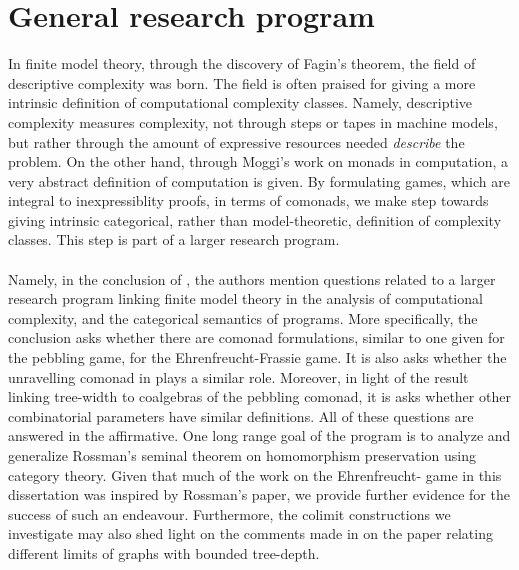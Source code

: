 \section{General research program}
In finite model theory, through the discovery of Fagin's theorem, the field of descriptive complexity was born. The field is often praised for giving a more intrinsic definition of computational complexity classes. Namely, descriptive complexity measures complexity, not through steps or tapes in machine models, but rather through the amount of expressive resources needed \textit{describe} the problem. On the other hand, through Moggi's work on monads in computation, a very abstract definition of computation is given. By formulating games, which are integral to inexpressiblity proofs, in terms of comonads, we make step towards giving intrinsic categorical, rather than model-theoretic, definition of complexity classes. This step is part of a larger research program. \\~\\
Namely, in the conclusion of \cite{Abramsky2017}, the authors mention questions related to a larger research program linking finite model theory in the analysis of computational complexity, and the categorical semantics of programs. More specifically, the conclusion asks whether there are comonad formulations, similar to one given for the pebbling game, for the Ehrenfreucht-Frassie game. It is also asks whether the unravelling comonad in \cite{Gradel2014} plays a similar role. Moreover, in light of the result linking tree-width to coalgebras of the pebbling comonad, it is asks whether other combinatorial parameters have similar definitions. All of these questions are answered in the affirmative. One long range goal of the program is to analyze and generalize Rossman's seminal theorem on homomorphism preservation using category theory. Given that much of the work on the Ehrenfreucht-{\Fraisse} game in this dissertation was inspired by Rossman's paper, we provide further evidence for the success of such an endeavour. Furthermore, the colimit constructions we investigate may also shed light on the comments made in \cite{Abramsky2017} on the paper \cite{Nesetril2013} relating different limits of graphs with bounded tree-depth. 
